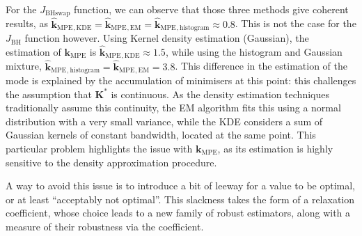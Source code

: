 \documentclass[preprint, 1p]{elsarticle}
\newcommand{\kmpe}{{\mathbf{k}}_{\mathrm{MPE}}}
\newcommand{\hatkmpe}{\hat{\mathbf{k}}_{\mathrm{MPE}}}
\newcommand{\arthur}[1]{{\itshape\color{cyan} ({#1})}}
\newcommand{\elise}[1]{{\itshape\color{red} ({#1})}}
\begin{document}
For the $J_{\mathrm{BHswap}}$ function, we can observe that those three methods give coherent results, as $\hatkmpe {}_{,\mathrm{KDE}} =\hatkmpe {}_{,\mathrm{EM}}=\hatkmpe {}_{,\mathrm{histogram}}\approx 0.8$. This is not the case for the  $J_{\mathrm{BH}}$ function however. Using Kernel density estimation (Gaussian), the estimation of $\kmpe$ is $\hatkmpe {}_{,\mathrm{KDE}} \approx 1.5$, while using the histogram and Gaussian mixture, $\hatkmpe {}_{,\mathrm{histogram}}=\hatkmpe {}_{,\mathrm{EM}}=3.8$.
This difference in the estimation of the mode is explained by the accumulation of minimisers at this point: this challenges the assumption that $\mathbf{K}^*$ is continuous. As the density estimation techniques traditionally assume this continuity, the EM algorithm fits this using a normal distribution with a very small variance, while the KDE considers a sum of Gaussian kernels of constant bandwidth, located at the same point. This particular problem highlights the issue with $\kmpe$, as its estimation is highly sensitive to the density approximation procedure.



A way to avoid this issue is to introduce a bit of leeway for a value to be optimal, or at least ``acceptably not optimal''. This slackness takes the form of a relaxation coefficient, whose choice leads to a new family of robust estimators, along with a measure of their robustness via the coefficient.
\end{document}
